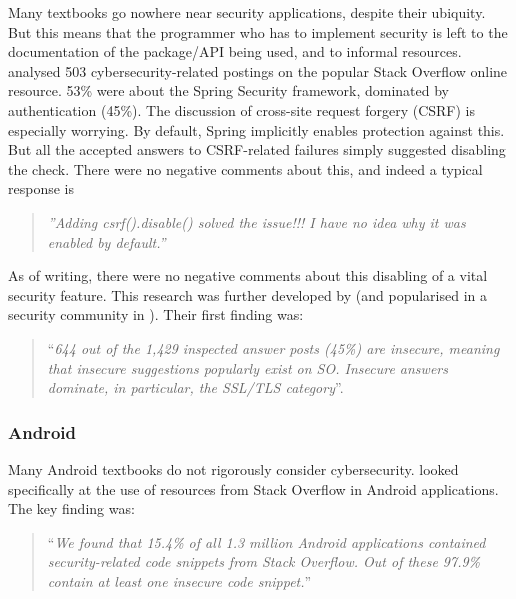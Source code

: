 \documentclass[sigconf]{acmart}
\begin{document}
Many textbooks go nowhere near security applications, despite their ubiquity.  But this means that the programmer who has to implement security is left to the documentation of the package/API being used, and to informal resources. \cite{Mengetal2018a} analysed 503 cybersecurity-related postings on the popular Stack Overflow online resource.  53\% were about the Spring Security framework, dominated by authentication (45\%). The discussion \cite[\S4.3.1]{Mengetal2018a} of cross-site request forgery (CSRF) is especially worrying.  By default, Spring implicitly enables protection against this. But all the accepted answers to CSRF-related failures simply suggested disabling the check. There were no negative comments about this, and indeed a typical response is 
\begin{quote}
	\textit{''Adding csrf().disable() solved the issue!!! I have no idea why it was enabled by default.''}
\end{quote}
As of writing, there were no negative comments about this disabling of a vital security feature. This research was further developed by \cite{Chenetal2019a}  (and popularised in a security community in \cite{Zorz2019a}). Their first finding was:

\begin{quote}
	``{\emph{644 out of the 1,429 inspected answer posts
			(45\%) are insecure, meaning that insecure suggestions
			popularly exist on SO. Insecure answers dominate, in
			particular, the SSL/TLS category}}''.
\end{quote} 

\subsubsection{Android}\label{sec:Android}
Many Android textbooks do not rigorously consider cybersecurity. \cite{Fischeretal2017a} looked specifically at the use of resources from Stack Overflow in Android applications. The key finding was:

\begin{quote}
	``{\emph{We found that 15.4\% of all 1.3 million Android applications
			contained security-related code snippets from
			Stack Overflow. Out of these 97.9\% contain at least one
			insecure code snippet.}}''
\end{quote}
\end{document}
